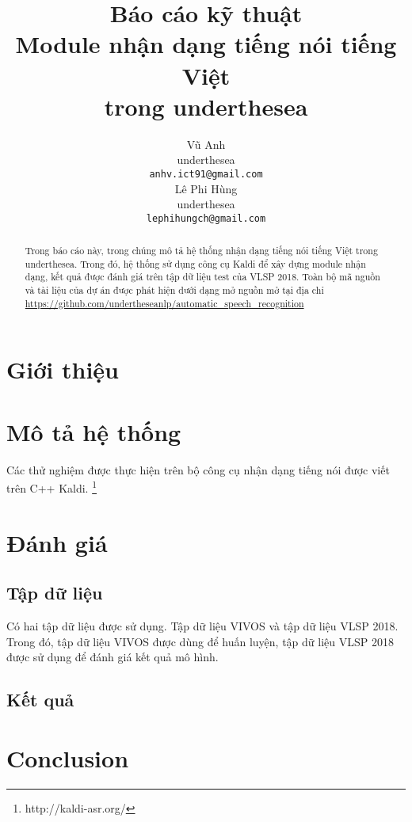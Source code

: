 \documentclass[11pt,a4paper]{article}
\title{Báo cáo kỹ thuật\\Module nhận dạng tiếng nói tiếng Việt\\ trong underthesea}
\author{
Vũ Anh\\
underthesea\\
{\tt anhv.ict91@gmail.com} \\
\And
Lê Phi Hùng \\
underthesea\\
{\tt lephihungch@gmail.com} \\
}
\date{}
\begin{document}
\maketitle
\begin{abstract}
Trong báo cáo này, trong chúng mô tả hệ thống nhận dạng tiếng nói tiếng Việt trong underthesea. Trong đó, hệ thống sử dụng công cụ Kaldi để xây dựng module nhận dạng, kết quả được đánh giá trên tập dữ liệu test của VLSP 2018. Toàn bộ mã nguồn và tài liệu của dự án được phát hiện dưới dạng mở nguồn mở tại địa chỉ \url{https://github.com/undertheseanlp/automatic_speech_recognition}

\end{abstract}

\section{Giới thiệu}

\section{Mô tả hệ thống}

Các thử nghiệm được thực hiện trên bộ công cụ nhận dạng tiếng nói được viết trên C++ Kaldi. \footnote{http://kaldi-asr.org/}

\section{Đánh giá}

\subsection{Tập dữ liệu}

Có hai tập dữ liệu được sử dụng. Tập dữ liệu VIVOS và tập dữ liệu VLSP 2018. Trong đó, tập dữ liệu VIVOS được dùng để huấn luyện, tập dữ liệu VLSP 2018 được sử dụng để đánh giá kết quả mô hình.

\subsection{Kết quả}


\section{Conclusion}




\end{document}
